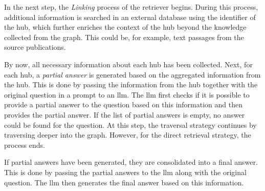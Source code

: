 In the next step, the \emph{Linking} process of the retriever begins. During this process, additional information is searched in an external database using the identifier of the hub, which further enriches the context of the hub beyond the knowledge collected from the graph. This could be, for example, text passages from the source publications.

By now, all necessary information about each hub has been collected. Next, for each hub, a \emph{partial answer} is generated based on the aggregated information from the hub. This is done by passing the information from the hub together with the original question in a prompt to an \gls{llm}. The \gls{llm} first checks if it is possible to provide a partial answer to the question based on this information and then provides the partial answer. If the list of partial answers is empty, no answer could be found for the question. At this step, the traversal strategy continues by traversing deeper into the graph. However, for the direct retrieval strategy, the process ends.

If partial answers have been generated, they are consolidated into a final answer. This is done by passing the partial answers to the \gls{llm} along with the original question. The \gls{llm} then generates the final answer based on this information. 
